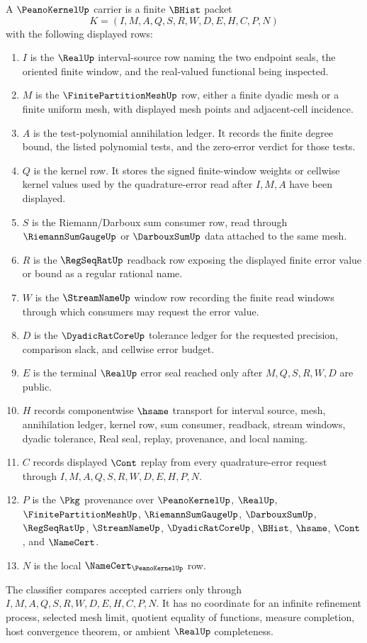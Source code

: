 \begin{definition}
\label{def:peano-kernel-carrier}
A $\PeanoKernelUp$ carrier is a finite $\BHist$ packet
$$
K=(I,M,A,Q,S,R,W,D,E,H,C,P,N)
$$
with the following displayed rows:
\begin{enumerate}
\item $I$ is the $\RealUp$ interval-source row naming the two endpoint seals, the oriented finite window, and the real-valued functional being inspected.
\item $M$ is the $\FinitePartitionMeshUp$ row, either a finite dyadic mesh or a finite uniform mesh, with displayed mesh points and adjacent-cell incidence.
\item $A$ is the test-polynomial annihilation ledger. It records the finite degree bound, the listed polynomial tests, and the zero-error verdict for those tests.
\item $Q$ is the kernel row. It stores the signed finite-window weights or cellwise kernel values used by the quadrature-error read after $I,M,A$ have been displayed.
\item $S$ is the Riemann/Darboux sum consumer row, read through $\RiemannSumGaugeUp$ or $\DarbouxSumUp$ data attached to the same mesh.
\item $R$ is the $\RegSeqRatUp$ readback row exposing the displayed finite error value or bound as a regular rational name.
\item $W$ is the $\StreamNameUp$ window row recording the finite read windows through which consumers may request the error value.
\item $D$ is the $\DyadicRatCoreUp$ tolerance ledger for the requested precision, comparison slack, and cellwise error budget.
\item $E$ is the terminal $\RealUp$ error seal reached only after $M,Q,S,R,W,D$ are public.
\item $H$ records componentwise $\hsame$ transport for interval source, mesh, annihilation ledger, kernel row, sum consumer, readback, stream windows, dyadic tolerance, Real seal, replay, provenance, and local naming.
\item $C$ records displayed $\Cont$ replay from every quadrature-error request through $I,M,A,Q,S,R,W,D,E,H,P,N$.
\item $P$ is the $\Pkg$ provenance over $\PeanoKernelUp$, $\RealUp$, $\FinitePartitionMeshUp$, $\RiemannSumGaugeUp$, $\DarbouxSumUp$, $\RegSeqRatUp$, $\StreamNameUp$, $\DyadicRatCoreUp$, $\BHist$, $\hsame$, $\Cont$, and $\NameCert$.
\item $N$ is the local $\NameCert_{\PeanoKernelUp}$ row.
\end{enumerate}
The classifier compares accepted carriers only through $I,M,A,Q,S,R,W,D,E,H,C,P,N$. It has no coordinate for an infinite refinement process, selected mesh limit, quotient equality of functions, measure completion, host convergence theorem, or ambient $\RealUp$ completeness.
\end{definition}

